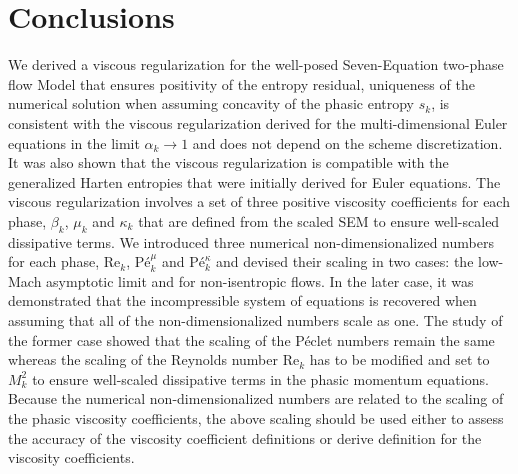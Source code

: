 \documentclass[preprint,10pt]{elsarticle}
\renewcommand{\Re}{\textrm{Re}}
\newcommand{\Pe}{\textrm{P\'e}}
\begin{document}
\section{Conclusions}\label{sec:conclusion}
We derived a viscous regularization for the well-posed Seven-Equation two-phase flow Model that ensures positivity of the entropy residual, uniqueness of the numerical solution when assuming concavity of the phasic entropy $s_k$, is consistent with the viscous regularization derived for the multi-dimensional Euler equations in the limit $\alpha_k \to 1$ and does not depend on the scheme discretization. It was also shown that the viscous regularization is compatible with the generalized Harten entropies that were initially derived for Euler equations. The viscous regularization involves a set of three positive viscosity coefficients for each phase, $\beta_k$, $\mu_k$ and $\kappa_k$ that are defined from the scaled SEM to ensure well-scaled dissipative terms. We introduced three numerical non-dimensionalized numbers for each phase, $\Re_k$, $\Pe_k^\mu$ and $\Pe_k^\kappa$ and devised their scaling in two cases: the low-Mach asymptotic limit and for non-isentropic flows. In the later case, it was demonstrated that the incompressible system of equations is recovered when assuming that all of the non-dimensionalized numbers scale as one. The study of the former case showed that the scaling of the P\'eclet numbers remain the same whereas the scaling of the Reynolds number $\Re_k$ has to be modified and set to $M_k^2$ to ensure well-scaled dissipative terms in the phasic momentum equations. Because the numerical non-dimensionalized numbers are related to the scaling of the phasic viscosity coefficients, the above scaling should be used either to assess the accuracy of the viscosity coefficient definitions or derive definition for the viscosity coefficients. 
\end{document}
